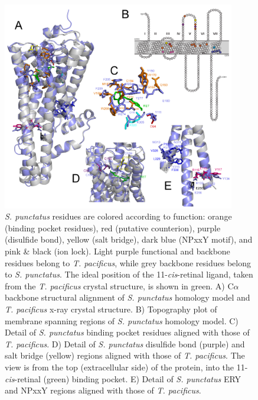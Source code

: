 \begin{figure}[htbp]
  \includegraphics[width=4in]{./Chapter_RhodStruct/img/SpStructure.png}
  \caption[Structural details of the \textit{S. punctatus} chytriopsin homology model.]{\textit{S. punctatus} residues are colored according to function: orange (binding pocket residues), red (putative counterion), purple (disulfide bond), yellow (salt bridge), dark blue (NPxxY motif), and pink \& black (ion lock). Light purple functional and backbone residues belong to \textit{T. pacificus}, while grey backbone residues belong to \textit{S. punctatus}. The ideal position of the 11-\textit{cis}-retinal ligand, taken from the \textit{T. pacificus} crystal structure, is shown in green. A) C$\alpha$ backbone structural alignment of \textit{S. punctatus} homology model and \textit{T. pacificus} x-ray crystal structure. B) Topography plot of membrane spanning regions of \textit{S. punctatus} homology model. C) Detail of \textit{S. punctatus} binding pocket residues aligned with those of \textit{T. pacificus}. D) Detail of \textit{S. punctatus} disulfide bond (purple) and salt bridge (yellow) regions aligned with those of \textit{T. pacificus}. The view is from the top (extracellular side) of the protein, into the 11-\textit{cis}-retinal (green) binding pocket. E) Detail of \textit{S. punctatus} ERY and NPxxY regions aligned with those of \textit{T. pacificus}.}
  \label{fig:ChRhodS_SpStructure}
\end{figure}

